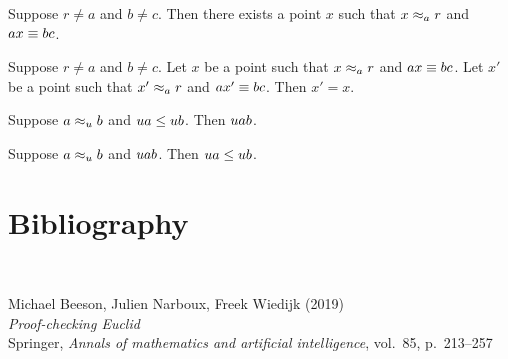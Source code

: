 \documentclass[10pt,a4paper,parskip=half,numbers=endperiod,parskip]{scrartcl}
\begin{document}



  \begin{forthel}
    \begin{lemma} %
      Suppose $r\neq a$ and $b\neq c$.
      Then there exists a point $x$ such that
        $\RelEquiv{x}{r}{a}$ and $\Cong{a}{x}{b}{c}$.
    \end{lemma}

    \begin{lemma} %
      Suppose $r\neq a$ and $b\neq c$.
      Let $x$ be a point such that
        $\RelEquiv{x}{r}{a}$ and $\Cong{a}{x}{b}{c}$.
      Let $x'$ be a point such that
        $\RelEquiv{x'}{r}{a}$ and $\Cong{a}{x'}{b}{c}$.
      Then $x' = x$.
    \end{lemma}

    \begin{lemma} %
      Suppose $\RelEquiv{a}{b}{u}$ and $\Leq{u}{a}{u}{b}$.
      Then $\Betw{u}{a}{b}$.
    \end{lemma}

    \begin{lemma} %
      Suppose $\RelEquiv{a}{b}{u}$ and $\Betw{u}{a}{b}$.
      Then $\Leq{u}{a}{u}{b}$.
    \end{lemma}
  \end{forthel}

  \newpage
  \section*{Bibliography}
  \

  Michael Beeson, Julien Narboux, Freek Wiedijk (2019)
  \\ \textit{Proof-checking Euclid}
  \\ Springer, \textit{Annals of mathematics and artificial intelligence}, vol.~85, p.~213--257
\end{document}
